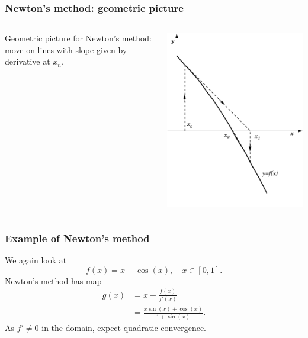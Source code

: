 \documentclass{beamer}
\begin{document}
\begin{frame}
  \frametitle{Newton's method: geometric picture}

  \begin{columns}
    \begin{column}{0.5\textwidth}
      Geometric picture for Newton's method: move on lines
      with slope given by derivative at $x_n$.
    \end{column}
    \begin{column}{0.5\textwidth}
      \begin{center}
        \includegraphics[width=\textwidth]{figures/Newton}
      \end{center}
    \end{column}
  \end{columns}

\end{frame}

\begin{frame}
  \frametitle{Example of Newton's method}

  We again look at
  \begin{equation*}
    f(x) = x - \cos(x), \quad x \in [0, 1].
  \end{equation*}
  Newton's method has map
  \begin{align*}
    g(x) & = x - \frac{f(x)}{f'(x)} \\
    & = \frac{x \sin(x) + \cos(x)}{1 + \sin(x)}.
  \end{align*}
  As $f' \ne 0$ in the domain, expect quadratic convergence.

\end{frame}
\end{document}
